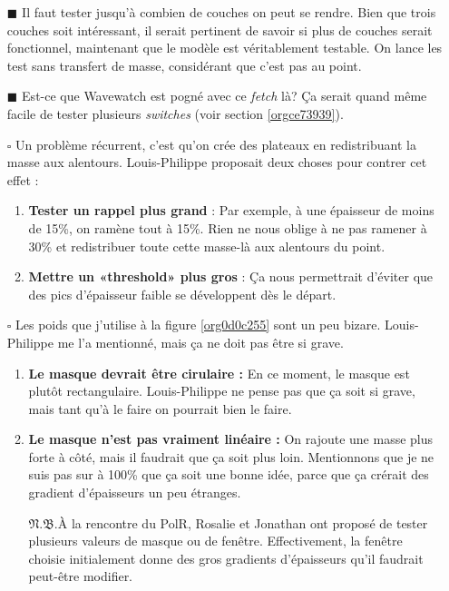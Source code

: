 \documentclass[10pt]{article}
\numberwithin{equation}{section}
\renewcommand{\boxtimes}{\blacksquare}
\newcommand{\pt}{\hspace{1pt}} %
\newcommand{\nb}{\underline{{\footnotesize\EightStarConvex}\pt $\mathfrak{N.B.}$\vphantom{p}}\hspace{3pt}}
\begin{document}
\begin{itemize}
\item[{$\boxtimes$}] Il faut tester jusqu'à combien de couches on peut se rendre.
Bien que trois couches soit intéressant, il serait pertinent de savoir si plus de couches serait fonctionnel, maintenant que le modèle est véritablement testable.
On lance les test sans transfert de masse, considérant que c'est pas au point.\bigskip

\item[{$\boxtimes$}] Est-ce que Wavewatch est pogné avec ce \emph{fetch} là? Ça serait quand même facile de tester plusieurs \emph{switches} (voir section \ref{orgce73939}). \bigskip

\item[{$\square$}] Un problème récurrent, c'est qu'on crée des plateaux en redistribuant la masse aux alentours.
Louis-Philippe proposait deux choses pour contrer cet effet :
\begin{enumerate}
\item \textbf{Tester un rappel plus grand} : Par exemple, à une épaisseur de moins de 15\%, on ramène tout à 15\%.
Rien ne nous oblige à ne pas ramener à 30\% et redistribuer toute cette masse-là aux alentours du point.
\item \textbf{Mettre un «threshold» plus gros} : Ça nous permettrait d'éviter que des pics d'épaisseur faible se développent dès le départ.\bigskip
\end{enumerate}

\item[{$\square$}] Les poids que j'utilise à la figure \ref{org0d0c255} sont un peu bizare.
Louis-Philippe me l'a mentionné, mais ça ne doit pas être si grave. 
\begin{enumerate}
\item \textbf{Le masque devrait être cirulaire :}
En ce moment, le masque est plutôt rectangulaire.
Louis-Philippe ne pense pas que ça soit si grave, mais tant qu'à le faire on pourrait bien le faire.
\item \textbf{Le masque n'est pas vraiment linéaire :} On rajoute une masse plus forte à côté, mais il faudrait que ça soit plus loin.
Mentionnons que je ne suis pas sur à 100\% que ça soit une bonne idée, parce que ça crérait des gradient d'épaisseurs un peu étranges.\bigskip

\nb À la rencontre du PolR, Rosalie et Jonathan ont proposé de tester plusieurs valeurs de masque ou de fenêtre.
Effectivement, la fenêtre choisie initialement donne des gros gradients d'épaisseurs qu'il faudrait peut-être modifier.\bigskip
\end{enumerate}


\end{itemize}
\end{document}
